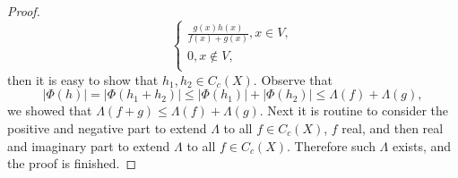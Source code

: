\begin{proof}
$$\begin{cases}
	\frac{g\left( x \right) h\left( x \right)}{f\left( x \right) +g\left( x \right)},x\in V,\\
	0,x\notin V,\\
\end{cases}
$$
then it is easy to show that $h_1,h_2\in C_c(X)$. Observe that 
$$
\left| \Phi \left( h \right) \right|=\left| \Phi \left( h_1+h_2 \right) \right|\le \left| \Phi \left( h_1 \right) \right|+\left| \Phi \left( h_2 \right) \right|\le \Lambda \left( f \right) +\Lambda \left( g \right) ,
$$
we showed that $\Lambda \left( f+g \right) \le \Lambda \left( f \right) +\Lambda \left( g \right) $. Next it is routine to consider the positive and negative part to extend $\Lambda$ to all $f\in C_c(X)$, $f$ real, and then real and imaginary part to extend $\Lambda$ to all $f\in C_c(X)$. Therefore such $\Lambda$ exists, and the proof is finished.
\end{proof}
